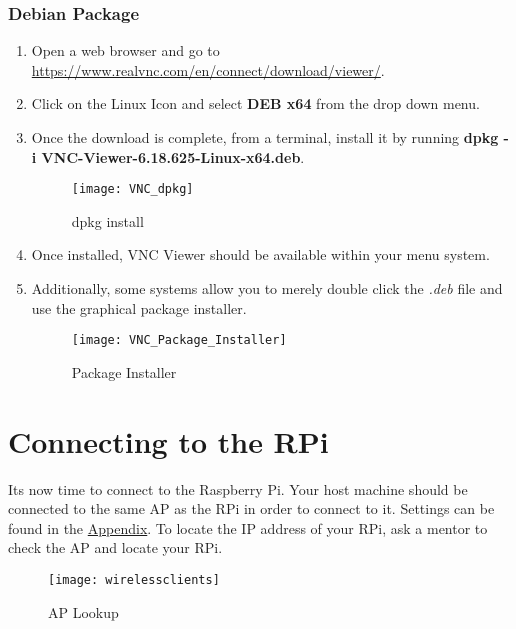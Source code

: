 \documentclass[
a4paper,
fontsize=14pt, %
pagesize, %
parskip=half-, %
]{scrartcl} %
\theoremstyle{mythmstyle} %
\begin{document}
\subsubsection{Debian Package}
\begin{enumerate}
    \item Open a web browser and go to \url{https://www.realvnc.com/en/connect/download/viewer/}.
    \item Click on the Linux Icon and select \textbf{DEB x64} from the drop down menu.
    
    \clearpage
    
    \item Once the download is complete, from a terminal, install it by running \textbf{dpkg -i VNC-Viewer-6.18.625-Linux-x64.deb}.
    \begin{figure}[h]
        \centering\texttt{[image: VNC\_dpkg]}
        \caption{dpkg install}
    \end{figure}
    \item Once installed, VNC Viewer should be available within your menu system.
    \item Additionally, some systems allow you to merely double click the \emph{.deb} file and use the graphical package installer.
     \begin{figure}[h]
         \centering\texttt{[image: VNC\_Package\_Installer]}
         \caption{Package Installer}
     \end{figure}
\end{enumerate}

\clearpage
\section{Connecting to the RPi}
Its now time to connect to the Raspberry Pi. Your host machine should be connected to the same AP as the RPi in order to connect to it.  Settings can be found in the \hyperlink{wifi}{Appendix}. To locate the IP address of your RPi, ask a mentor to check the AP and locate your RPi.
\begin{figure}[h]
    \centering\texttt{[image: wirelessclients]}
    \caption{AP Lookup}
\end{figure}
\end{document}
